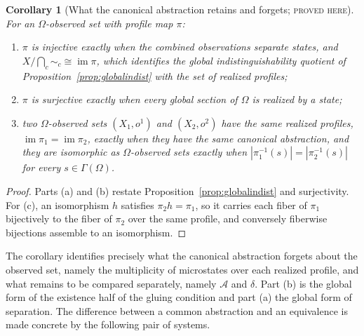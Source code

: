 \documentclass[11pt]{article}
\newtheorem{corollary}[theorem]{Corollary}
\theoremstyle{definition}
\theoremstyle{remark}
\newcommand{\stN}{\textsc{proved here}}
\newcommand{\cA}{\mathcal A}
\newcommand{\im}{\operatorname{im}}
\newcommand{\sk}{\sim}
\begin{document}
\begin{corollary}[What the canonical abstraction retains and forgets; \stN]\label{cor:retains}
For an $\Omega$-observed set with profile map $\pi$:
\begin{enumerate}[label=(\alph*)]
\item $\pi$ is injective exactly when the combined observations separate states, and $X/\bigcap_c{\sk_c}\cong\im\pi$, which identifies the global indistinguishability quotient of Proposition~\ref{prop:globalindist} with the set of realized profiles;
\item $\pi$ is surjective exactly when every global section of $\Omega$ is realized by a state;
\item two $\Omega$-observed sets $(X_1,o^1)$ and $(X_2,o^2)$ have the same realized profiles, $\im\pi_1=\im\pi_2$, exactly when they have the same canonical abstraction, and they are isomorphic as $\Omega$-observed sets exactly when $|\pi_1^{-1}(s)|=|\pi_2^{-1}(s)|$ for every $s\in\Gamma(\Omega)$.
\end{enumerate}
\end{corollary}
\begin{proof}
Parts (a) and (b) restate Proposition~\ref{prop:globalindist} and surjectivity. For (c), an isomorphism $h$ satisfies $\pi_2h=\pi_1$, so it carries each fiber of $\pi_1$ bijectively to the fiber of $\pi_2$ over the same profile, and conversely fiberwise bijections assemble to an isomorphism.
\end{proof}

The corollary identifies precisely what the canonical abstraction forgets about the observed set, namely the multiplicity of microstates over each realized profile, and what remains to be compared separately, namely $\cA$ and $\delta$. Part (b) is the global form of the existence half of the gluing condition and part (a) the global form of separation. The difference between a common abstraction and an equivalence is made concrete by the following pair of systems.
\end{document}
